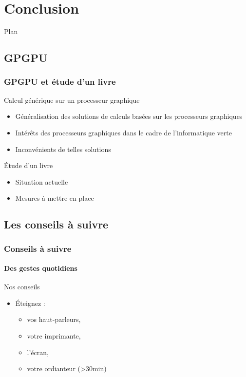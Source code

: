 \documentclass[slidetop,11pt]{beamer}
\begin{document}
\section{Conclusion}
\begin{frame}{Plan}
  \tableofcontents[sections=\thesection]
\end{frame}

\subsection{GPGPU}

\begin{frame} 
  \frametitle{GPGPU et étude d'un livre}
  \begin{block}{Calcul générique sur un processeur graphique}
     \begin{itemize}[<+->]
       \item Généralisation des solutions de calculs basées sur les processeurs graphiques
       \item Intérêts des processeurs graphiques dans le cadre de l'informatique verte
       \item Inconvénients de telles solutions
     \end{itemize}
   \end{block}
   \begin{block}{\'Etude d'un livre}
     \begin{itemize}[<+->]
       \item Situation actuelle
       \item Mesures à mettre en place
     \end{itemize}
   \end{block} 
\end{frame}


\subsection{Les conseils à suivre}
\begin{frame} 
  \frametitle{Conseils à suivre}
  \framesubtitle{Des gestes quotidiens}
  \begin{block}{Nos conseils}
     \begin{itemize}[<+->]
       \item Éteignez :
       \begin{itemize}
         \item vos haut-parleurs,
         \item votre imprimante,
         \item l'écran,
         \item votre ordianteur (>30min)
       \end{itemize}
     \end{itemize}
  \end{block}   
\end{frame}
\end{document}
